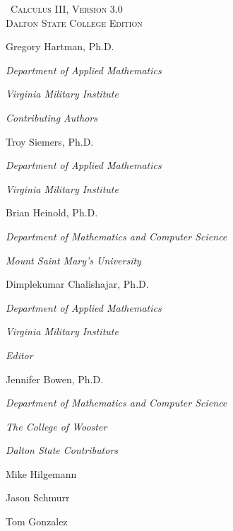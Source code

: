 
\hskip 125pt\begin{minipage}{\textwidth}
\begin{flushright}

\textsc{\large \apex\ {\Huge Calculus III}, {\small Version 3.0}} \\

\textsc{Dalton State College Edition}\\
{
\Large
\vspace{0.25in}

Gregory Hartman, Ph.D.

\emph{\small Department of Applied Mathematics}

\emph{\small Virginia Military Institute}\vskip15pt

\parbox{200pt}{\textit{Contributing Authors}}\hskip 2cm \phantom{.}

Troy Siemers, Ph.D.

\emph{\small Department of Applied Mathematics}

\emph{\small Virginia Military Institute}\vskip 15pt

Brian Heinold, Ph.D.

\emph{\small Department of Mathematics and Computer Science}

\emph{\small Mount Saint Mary's University}\vskip 15pt

Dimplekumar Chalishajar, Ph.D.

\emph{\small Department of Applied Mathematics}

\emph{\small Virginia Military Institute}\vskip 15pt

\parbox{200pt}{\textit{Editor}}\hskip 2cm \phantom{.}

Jennifer Bowen, Ph.D.

\emph{\small Department of Mathematics and Computer Science}

\emph{\small The College of Wooster} \vskip 15pt

\parbox{200pt}{\textit{Dalton State Contributors}}\hskip 2cm \phantom{.}

\normalsize

Mike Hilgemann \vskip 5pt

Jason Schmurr \vskip 5pt

Tom Gonzalez}
\end{flushright}
\end{minipage}


